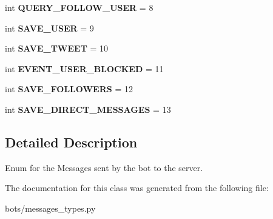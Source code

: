 \begin{DoxyCompactItemize}
\mbox{\label{classtwitter_1_1bots_1_1messages__types_1_1BotToServer_ae59feacd2e18ec6f834fab1c78fcaf5b}} 
int {\bfseries Q\+U\+E\+R\+Y\+\_\+\+F\+O\+L\+L\+O\+W\+\_\+\+U\+S\+ER} = 8
\item 
\mbox{\label{classtwitter_1_1bots_1_1messages__types_1_1BotToServer_a56395fa1744d9e0cc651db321dbba982}} 
int {\bfseries S\+A\+V\+E\+\_\+\+U\+S\+ER} = 9
\item 
\mbox{\label{classtwitter_1_1bots_1_1messages__types_1_1BotToServer_a2d5b514d5acd789996554334b6400168}} 
int {\bfseries S\+A\+V\+E\+\_\+\+T\+W\+E\+ET} = 10
\item 
\mbox{\label{classtwitter_1_1bots_1_1messages__types_1_1BotToServer_a8a6114726265b63d224fe3c0bb22e327}} 
int {\bfseries E\+V\+E\+N\+T\+\_\+\+U\+S\+E\+R\+\_\+\+B\+L\+O\+C\+K\+ED} = 11
\item 
\mbox{\label{classtwitter_1_1bots_1_1messages__types_1_1BotToServer_a142b0d8e3ee184b8a6ad1283ca23ad7a}} 
int {\bfseries S\+A\+V\+E\+\_\+\+F\+O\+L\+L\+O\+W\+E\+RS} = 12
\item 
\mbox{\label{classtwitter_1_1bots_1_1messages__types_1_1BotToServer_a0bbf4b687a54dca2b3ab3b4c6c01cc4a}} 
int {\bfseries S\+A\+V\+E\+\_\+\+D\+I\+R\+E\+C\+T\+\_\+\+M\+E\+S\+S\+A\+G\+ES} = 13
\end{DoxyCompactItemize}


\subsection{Detailed Description}
\begin{DoxyVerb}Enum for the Messages sent by the bot to the server.
\end{DoxyVerb}
 

The documentation for this class was generated from the following file\+:\begin{DoxyCompactItemize}
\item 
bots/messages\+\_\+types.\+py\end{DoxyCompactItemize}
